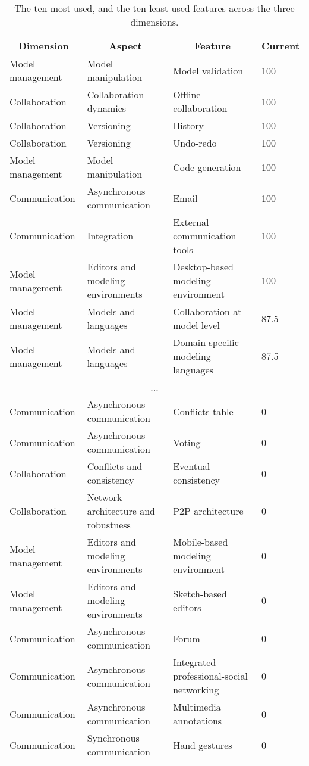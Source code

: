 
  \begin{table*}[]
  \centering
  \notsotiny
  \caption{ The ten most used, and the ten least used features across the three dimensions.}
\label{tab:top-bottom-current}
\begin{tabular}{@{}llll@{}}
  \toprule
\multicolumn{1}{c}{\textbf{Dimension}} & \multicolumn{1}{c}{\textbf{Aspect}} & \multicolumn{1}{c}{\textbf{Feature}} & \multicolumn{1}{c}{\textbf{Current}} \\ 

  \midrule
  Model management & Model manipulation & Model validation & 100 \\ 
Collaboration & Collaboration dynamics & Offline collaboration & 100 \\ 
Collaboration & Versioning & History & 100 \\ 
Collaboration & Versioning & Undo-redo & 100 \\ 
Model management & Model manipulation & Code generation & 100 \\ 
Communication & Asynchronous communication & Email & 100 \\ 
Communication & Integration & External communication tools & 100 \\ 
Model management & Editors and modeling environments & Desktop-based modeling environment & 100 \\ 
Model management & Models and languages & Collaboration at model level & 87.5 \\ 
Model management & Models and languages & Domain-specific modeling languages & 87.5 \\ 
\multicolumn{4}{c}{...} \\ 
Communication & Asynchronous communication & Conflicts table & 0 \\ 
Communication & Asynchronous communication & Voting & 0 \\ 
Collaboration & Conflicts and consistency & Eventual consistency & 0 \\ 
Collaboration & Network architecture and robustness & P2P architecture & 0 \\ 
Model management & Editors and modeling environments & Mobile-based modeling environment & 0 \\ 
Model management & Editors and modeling environments & Sketch-based editors & 0 \\ 
Communication & Asynchronous communication & Forum & 0 \\ 
Communication & Asynchronous communication & Integrated professional-social networking & 0 \\ 
Communication & Asynchronous communication & Multimedia annotations & 0 \\ 
Communication & Synchronous communication & Hand gestures & 0 \\ 
\bottomrule
  \end{tabular}%
  \end{table*}